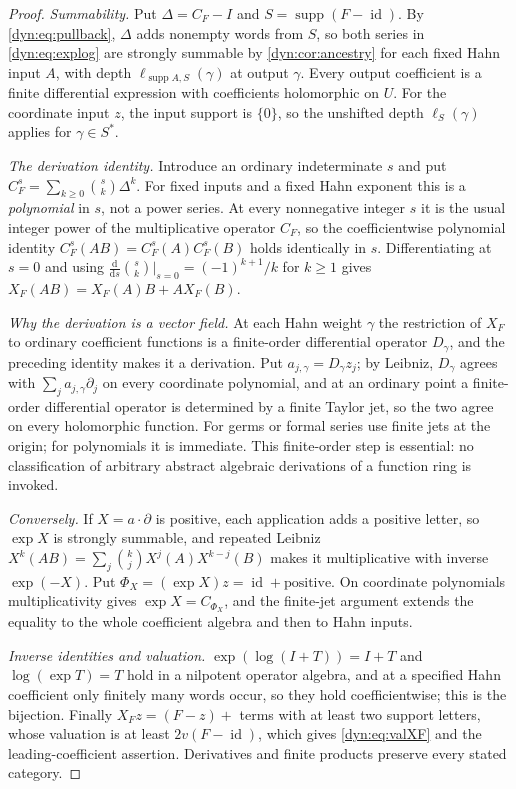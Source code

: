 \documentclass[11pt,letterpaper]{article}
\theoremstyle{definition}
\theoremstyle{remark}
\newcommand{\id}{\operatorname{id}}
\newcommand{\supp}{\operatorname{supp}}
\numberwithin{equation}{section}
\begin{document}
\begin{proof}
\emph{Summability.} Put $\Delta=C_F-I$ and $S=\supp(F-\id)$. By
\eqref{dyn:eq:pullback}, $\Delta$ adds nonempty words from $S$, so both
series in \eqref{dyn:eq:explog} are strongly summable by
\cref{dyn:cor:ancestry} for each fixed Hahn input $A$, with depth
$\ell_{\supp A,S}(\gamma)$ at output $\gamma$. Every output coefficient is
a finite differential expression with coefficients holomorphic on $U$.
For the coordinate input $z$, the input support is $\{0\}$, so the
unshifted depth $\ell_S(\gamma)$ applies for $\gamma\in S^{*}$.

\emph{The derivation identity.} Introduce an ordinary indeterminate $s$ and
put $C_F^{s}=\sum_{k\ge0}\binom{s}{k}\Delta^{k}$. For fixed inputs and a
fixed Hahn exponent this is a \emph{polynomial} in $s$, not a power series.
At every nonnegative integer $s$ it is the usual integer power of the
multiplicative operator $C_F$, so the coefficientwise polynomial identity
$C_F^{s}(AB)=C_F^{s}(A)C_F^{s}(B)$ holds identically in $s$.
Differentiating at $s=0$ and using
$\frac{\mathrm d}{\mathrm ds}\binom{s}{k}\big|_{s=0}=(-1)^{k+1}/k$ for
$k\ge1$ gives $X_F(AB)=X_F(A)B+AX_F(B)$.

\emph{Why the derivation is a vector field.} At each Hahn weight $\gamma$
the restriction of $X_F$ to ordinary coefficient functions is a
finite-order differential operator $D_\gamma$, and the preceding identity
makes it a derivation. Put $a_{j,\gamma}=D_\gamma z_j$; by Leibniz,
$D_\gamma$ agrees with $\sum_ja_{j,\gamma}\partial_j$ on every coordinate
polynomial, and at an ordinary point a finite-order differential operator
is determined by a finite Taylor jet, so the two agree on every holomorphic
function. For germs or formal series use finite jets at the origin; for
polynomials it is immediate. This finite-order step is essential: no
classification of arbitrary abstract algebraic derivations of a function
ring is invoked.

\emph{Conversely.} If $X=a\cdot\partial$ is positive, each application adds
a positive letter, so $\exp X$ is strongly summable, and repeated Leibniz
$X^{k}(AB)=\sum_j\binom kjX^{j}(A)X^{k-j}(B)$ makes it multiplicative with
inverse $\exp(-X)$. Put $\Phi_X=(\exp X)z=\id+\text{positive}$. On
coordinate polynomials multiplicativity gives $\exp X=C_{\Phi_X}$, and the
finite-jet argument extends the equality to the whole coefficient algebra
and then to Hahn inputs.

\emph{Inverse identities and valuation.} $\exp(\log(I+T))=I+T$ and
$\log(\exp T)=T$ hold in a nilpotent operator algebra, and at a specified
Hahn coefficient only finitely many words occur, so they hold
coefficientwise; this is the bijection. Finally $X_Fz=(F-z)+$ terms with at
least two support letters, whose valuation is at least $2v(F-\id)$, which
gives \eqref{dyn:eq:valXF} and the leading-coefficient assertion.
Derivatives and finite products preserve every stated category.
\end{proof}
\end{document}
